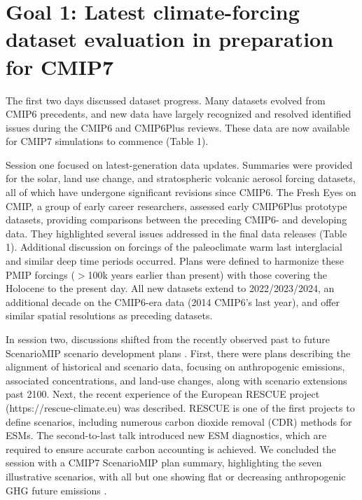 \documentclass{ametsocV6.1}
\begin{document}
\section*{Goal 1: Latest climate-forcing dataset evaluation in preparation for CMIP7}
The first two days discussed dataset progress. Many datasets evolved from CMIP6 precedents, and new data have largely recognized and resolved identified issues during the CMIP6 and CMIP6Plus reviews. These data are now available for CMIP7 simulations to commence (Table 1).

Session one focused on latest-generation data updates. Summaries were provided for the solar, land use change, and stratospheric volcanic aerosol forcing datasets, all of which have undergone significant revisions since CMIP6. The Fresh Eyes on CMIP, a group of early career researchers, assessed early CMIP6Plus prototype datasets, providing comparisons between the preceding CMIP6- and developing data. They highlighted several issues addressed in the final data releases (Table 1). Additional discussion on forcings of the paleoclimate warm last interglacial and similar deep time periods occurred. Plans were defined to harmonize these PMIP forcings ($>$100k years earlier than present) with those covering the Holocene to the present day. All new datasets extend to 2022/2023/2024, an additional decade on the CMIP6-era data (2014 CMIP6’s last year), and offer similar spatial resolutions as preceding datasets.

In session two, discussions shifted from the recently observed past to future ScenarioMIP scenario development plans \citep{van_vuuren_scenario_2025}. First, there were plans describing the alignment of historical and scenario data, focusing on anthropogenic emissions, associated concentrations, and land-use changes, along with scenario extensions past 2100. Next, the recent experience of the European RESCUE project (https://rescue-climate.eu) was described. RESCUE is one of the first projects to define scenarios, including numerous carbon dioxide removal (CDR) methods for ESMs. The second-to-last talk introduced new ESM diagnostics, which are required to ensure accurate carbon accounting is achieved. We concluded the session with a CMIP7 ScenarioMIP plan summary, highlighting the seven illustrative scenarios, with all but one showing flat or decreasing anthropogenic GHG future emissions \citep{van_vuuren_scenario_2025}.
\end{document}
